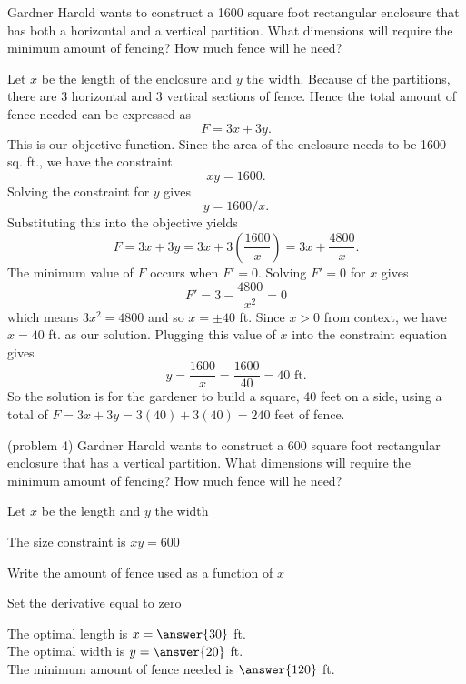 \documentclass{ximera}
\begin{document}
\begin{example}[example 4]
Gardner Harold wants to construct a 1600 square foot  rectangular enclosure that has both a 
horizontal and a vertical partition. What dimensions will require the minimum amount of fencing?  
How much fence will he need?

\begin{center}
\end{center}

Let $x$ be the length of the enclosure and $y$ the width. Because of the partitions, there are 3 horizontal and 3 vertical sections of fence. Hence the total amount of fence needed can be expressed as 
\[F = 3x + 3y.\]
 This is our objective function. Since the area of the enclosure needs to be 1600 sq. ft., we have the constraint 
\[xy = 1600.\]
Solving the constraint for $y$ gives 
\[
y = 1600/x.
\]
  Substituting this into the objective yields
\[F= 3x + 3y = 3x + 3\left(\frac{1600}{x}\right) = 3x + \frac{4800}{x}.\]
The minimum value of $F$ occurs when $F' = 0$. Solving $F' = 0$ for $x$ gives
\[F' = 3 - \frac{4800}{x^2} = 0\]
which means $3x^2 = 4800$ and so $x = \pm 40$ ft.  Since $x>0$ from context, we have $x = 40$ ft. as our solution.
Plugging this value of $x$ into the constraint equation gives
\[y = \frac{1600}{x} = \frac{1600}{40} = 40 \mbox{ ft.}\]
So the solution is for the gardener to build a square, 40 feet on a side, using a total of $F = 3x+ 3y = 3(40) + 3(40)
= 240$ feet of fence.
\end{example}

\begin{problem}(problem 4)
Gardner Harold wants to construct a 600 square foot  rectangular enclosure that has a 
vertical partition. What dimensions will require the minimum amount of fencing?  
How much fence will he need?

\begin{hint}
Let $x$ be the length and $y$ the width
\end{hint}
\begin{hint}
The size constraint is $xy = 600$
\end{hint}
\begin{hint}
Write the amount of fence used as a function of $x$
\end{hint}
\begin{hint}
Set the derivative equal to zero
\end{hint}

The optimal length is $x= \answer{30}$ ft.\\
The optimal width is $y = \answer{20}$ ft.\\
The minimum amount of fence needed is $\answer{120}$ ft.
\end{problem}
\end{document}
